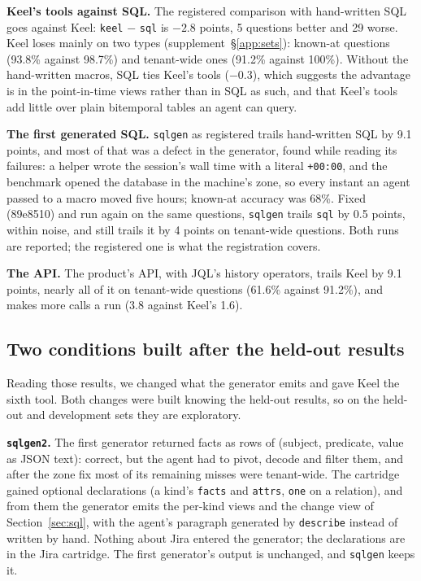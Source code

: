 \documentclass[sigconf, nonacm]{acmart}
\newcommand{\code}[1]{\texttt{#1}}
\begin{document}
\textbf{Keel's tools against SQL.} The registered comparison with hand-written SQL goes against Keel: \code{keel} $-$ \code{sql} is $-2.8$ points, 5 questions better and 29 worse. Keel loses mainly on two types (supplement~\S\ref{app:sets}): known-at questions (93.8\% against 98.7\%) and tenant-wide ones (91.2\% against 100\%). Without the hand-written macros, SQL ties Keel's tools ($-0.3$), which suggests the advantage is in the point-in-time views rather than in SQL as such, and that Keel's tools add little over plain bitemporal tables an agent can query.

\textbf{The first generated SQL.} \code{sqlgen} as registered trails hand-written SQL by 9.1 points, and most of that was a defect in the generator, found while reading its failures: a helper wrote the session's wall time with a literal \code{+00:00}, and the benchmark opened the database in the machine's zone, so every instant an agent passed to a macro moved five hours; known-at accuracy was 68\%. Fixed (89e8510) and run again on the same questions, \code{sqlgen} trails \code{sql} by 0.5 points, within noise, and still trails it by 4 points on tenant-wide questions. Both runs are reported; the registered one is what the registration covers.

\textbf{The API.} The product's API, with JQL's history operators, trails Keel by 9.1 points, nearly all of it on tenant-wide questions (61.6\% against 91.2\%), and makes more calls a run (3.8 against Keel's 1.6).

\subsection{Two conditions built after the held-out results}
\label{sec:posthoc}

Reading those results, we changed what the generator emits and gave Keel the sixth tool. Both changes were built knowing the held-out results, so on the held-out and development sets they are exploratory.

\textbf{\code{sqlgen2}.} The first generator returned facts as rows of (subject, predicate, value as JSON text): correct, but the agent had to pivot, decode and filter them, and after the zone fix most of its remaining misses were tenant-wide. The cartridge gained optional declarations (a kind's \code{facts} and \code{attrs}, \code{one} on a relation), and from them the generator emits the per-kind views and the change view of Section~\ref{sec:sql}, with the agent's paragraph generated by \code{describe} instead of written by hand. Nothing about Jira entered the generator; the declarations are in the Jira cartridge. The first generator's output is unchanged, and \code{sqlgen} keeps it.
\end{document}
